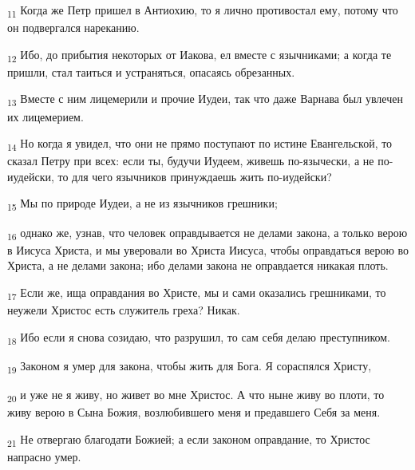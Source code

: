 \begin{tcolorbox}
\textsubscript{11} Когда же Петр пришел в Антиохию, то я лично противостал ему, потому что он подвергался нареканию.
\end{tcolorbox}
\begin{tcolorbox}
\textsubscript{12} Ибо, до прибытия некоторых от Иакова, ел вместе с язычниками; а когда те пришли, стал таиться и устраняться, опасаясь обрезанных.
\end{tcolorbox}
\begin{tcolorbox}
\textsubscript{13} Вместе с ним лицемерили и прочие Иудеи, так что даже Варнава был увлечен их лицемерием.
\end{tcolorbox}
\begin{tcolorbox}
\textsubscript{14} Но когда я увидел, что они не прямо поступают по истине Евангельской, то сказал Петру при всех: если ты, будучи Иудеем, живешь по-язычески, а не по-иудейски, то для чего язычников принуждаешь жить по-иудейски?
\end{tcolorbox}
\begin{tcolorbox}
\textsubscript{15} Мы по природе Иудеи, а не из язычников грешники;
\end{tcolorbox}
\begin{tcolorbox}
\textsubscript{16} однако же, узнав, что человек оправдывается не делами закона, а только верою в Иисуса Христа, и мы уверовали во Христа Иисуса, чтобы оправдаться верою во Христа, а не делами закона; ибо делами закона не оправдается никакая плоть.
\end{tcolorbox}
\begin{tcolorbox}
\textsubscript{17} Если же, ища оправдания во Христе, мы и сами оказались грешниками, то неужели Христос есть служитель греха? Никак.
\end{tcolorbox}
\begin{tcolorbox}
\textsubscript{18} Ибо если я снова созидаю, что разрушил, то сам себя делаю преступником.
\end{tcolorbox}
\begin{tcolorbox}
\textsubscript{19} Законом я умер для закона, чтобы жить для Бога. Я сораспялся Христу,
\end{tcolorbox}
\begin{tcolorbox}
\textsubscript{20} и уже не я живу, но живет во мне Христос. А что ныне живу во плоти, то живу верою в Сына Божия, возлюбившего меня и предавшего Себя за меня.
\end{tcolorbox}
\begin{tcolorbox}
\textsubscript{21} Не отвергаю благодати Божией; а если законом оправдание, то Христос напрасно умер.
\end{tcolorbox}
